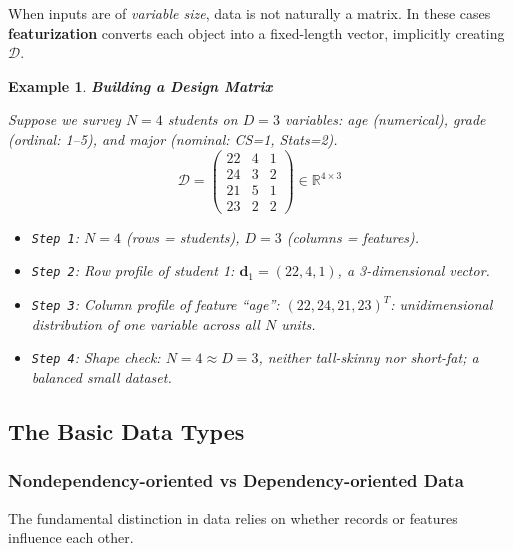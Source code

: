 \documentclass[11pt]{article}
\theoremstyle{smallexample}
\newtheorem{example}{Example}[section]
\newcommand{\vs}{\vspace{0.2\baselineskip}}
\begin{document}
When inputs are of \textit{variable size}, data is not
naturally a matrix. In these cases \textbf{featurization} converts each object
into a fixed-length vector, implicitly creating $\mathcal{D}$.

\vs

\begin{example}{\textbf{Building a Design Matrix}}

    Suppose we survey $N = 4$ students on $D = 3$ variables: age (numerical),
    grade (ordinal: 1--5), and major (nominal: CS=1, Stats=2).
    \[
        \mathcal{D} =
        \begin{pmatrix}
            22 & 4 & 1 \\
            24 & 3 & 2 \\
            21 & 5 & 1 \\
            23 & 2 & 2
        \end{pmatrix}
        \in \mathbb{R}^{4 \times 3}
    \]
    \begin{itemize}
        \item \texttt{Step 1}: $N = 4$ (rows = students), $D = 3$ (columns = features).

        \item \texttt{Step 2}: Row profile of student 1:
        $\mathbf{d}_1 = (22, 4, 1)$, a 3-dimensional vector.

        
        \item \texttt{Step 3}: Column profile of feature ``age'':
        $(22, 24, 21, 23)^T$: unidimensional distribution of one variable
        across all $N$ units.

        \item \texttt{Step 4}: Shape check: $N = 4 \approx D = 3$, neither tall-skinny
        nor short-fat; a balanced small dataset.
    \end{itemize}
\end{example}

\subsection{The Basic Data Types}

\subsubsection{Nondependency-oriented vs Dependency-oriented Data}

The fundamental distinction in data relies on whether records or features influence each other.
\end{document}

